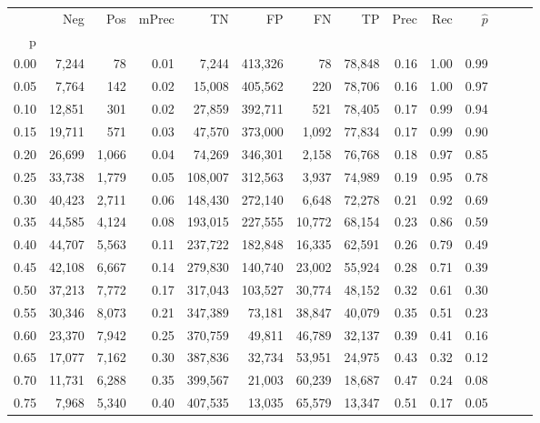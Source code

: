 \begin{tabular}{rrrrrrrrrrrrrr}
\toprule
{} &     Neg &    Pos & mPrec &       TN &       FP &      FN &      TP &  Prec &   Rec & $\hat{p}$ \\
p    &         &        &       &          &          &         &         &       &       &           \\
\midrule
0.00 &   7,244 &     78 &  0.01 &    7,244 &  413,326 &      78 &  78,848 &  0.16 &  1.00 &      0.99 \\
0.05 &   7,764 &    142 &  0.02 &   15,008 &  405,562 &     220 &  78,706 &  0.16 &  1.00 &      0.97 \\
0.10 &  12,851 &    301 &  0.02 &   27,859 &  392,711 &     521 &  78,405 &  0.17 &  0.99 &      0.94 \\
0.15 &  19,711 &    571 &  0.03 &   47,570 &  373,000 &   1,092 &  77,834 &  0.17 &  0.99 &      0.90 \\
0.20 &  26,699 &  1,066 &  0.04 &   74,269 &  346,301 &   2,158 &  76,768 &  0.18 &  0.97 &      0.85 \\
0.25 &  33,738 &  1,779 &  0.05 &  108,007 &  312,563 &   3,937 &  74,989 &  0.19 &  0.95 &      0.78 \\
0.30 &  40,423 &  2,711 &  0.06 &  148,430 &  272,140 &   6,648 &  72,278 &  0.21 &  0.92 &      0.69 \\
0.35 &  44,585 &  4,124 &  0.08 &  193,015 &  227,555 &  10,772 &  68,154 &  0.23 &  0.86 &      0.59 \\
0.40 &  44,707 &  5,563 &  0.11 &  237,722 &  182,848 &  16,335 &  62,591 &  0.26 &  0.79 &      0.49 \\
0.45 &  42,108 &  6,667 &  0.14 &  279,830 &  140,740 &  23,002 &  55,924 &  0.28 &  0.71 &      0.39 \\
0.50 &  37,213 &  7,772 &  0.17 &  317,043 &  103,527 &  30,774 &  48,152 &  0.32 &  0.61 &      0.30 \\
0.55 &  30,346 &  8,073 &  0.21 &  347,389 &   73,181 &  38,847 &  40,079 &  0.35 &  0.51 &      0.23 \\
0.60 &  23,370 &  7,942 &  0.25 &  370,759 &   49,811 &  46,789 &  32,137 &  0.39 &  0.41 &      0.16 \\
0.65 &  17,077 &  7,162 &  0.30 &  387,836 &   32,734 &  53,951 &  24,975 &  0.43 &  0.32 &      0.12 \\
0.70 &  11,731 &  6,288 &  0.35 &  399,567 &   21,003 &  60,239 &  18,687 &  0.47 &  0.24 &      0.08 \\
0.75 &   7,968 &  5,340 &  0.40 &  407,535 &   13,035 &  65,579 &  13,347 &  0.51 &  0.17 &      0.05 \\

\end{tabular}
